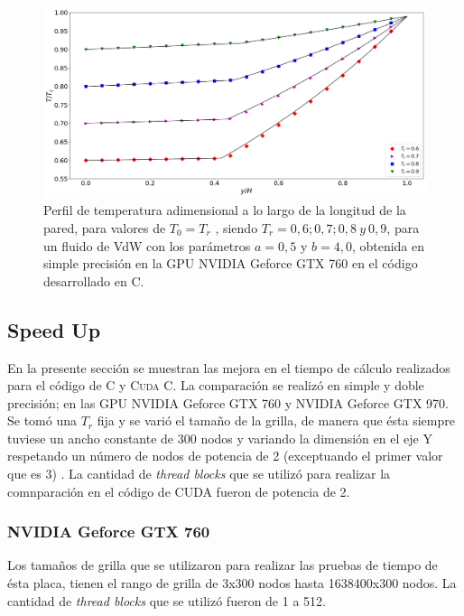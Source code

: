 \begin{figure}[htbp]
	\centering
	\includegraphics[width=\textwidth]{figs/cap4/v_760_VdW_c_simple_T_y}
	\caption{Perfil de temperatura adimensional a lo largo de la longitud de la pared, para valores de $T_0 = T_r$ , siendo $T_r = 0,6 ; 0,7 ; 0,8 \>y\> 0,9$, para un fluido de VdW con los parámetros $a = 0,5 $ y $b = 4,0 $, obtenida en simple precisión en la GPU NVIDIA Geforce GTX 760 en el código desarrollado en \textsc{C}.}
	\label{fig:v_760_VdW_c_simple_T_y}	
\end{figure}

\newpage

\subsection{Speed Up}

En la presente sección se muestran las mejora en el tiempo de cálculo realizados para el código de \textsc{C} y \textsc{Cuda C}. La comparación se realizó en simple y doble precisión; en las GPU NVIDIA Geforce GTX 760 y NVIDIA Geforce GTX 970. Se tomó una $T_r$ fija y se varió el tamaño de la grilla, de manera que ésta siempre tuviese un ancho constante de 300 nodos y variando la dimensión en el eje \textsc{Y} respetando un número de nodos de potencia de 2 (exceptuando el primer valor que es 3) . La cantidad de \textit{thread blocks} que se utilizó para realizar la comnparación en el código de \textsc{CUDA} fueron de potencia de 2.

\subsubsection{NVIDIA Geforce GTX 760}

Los tamaños de grilla que se utilizaron para realizar las pruebas de tiempo de ésta placa, tienen el rango de grilla de 3x300 nodos hasta 1638400x300 nodos. La cantidad de \textit{thread blocks} que se utilizó fueron de 1 a 512.

